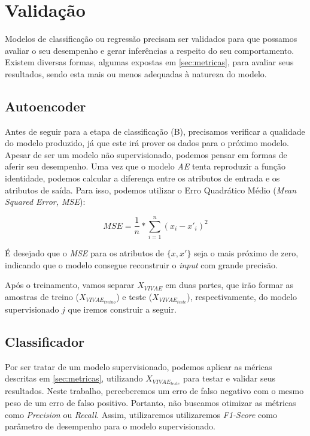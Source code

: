 \section{Validação}\label{sec:bravo_aval}

Modelos de classificação ou regressão precisam ser validados para que possamos avaliar o seu desempenho e gerar inferências a respeito do seu comportamento. Existem diversas formas, algumas expostas em \ref{sec:metricas}, para avaliar seus resultados, sendo esta mais ou menos adequadas à natureza do modelo.

\subsection{Autoencoder}

Antes de seguir para a etapa de classificação (B), precisamos verificar a qualidade do modelo produzido, já que este irá prover os dados para o próximo modelo. Apesar de ser um modelo não supervisionado, podemos pensar em formas de aferir seu desempenho. Uma vez que o modelo \textit{AE} tenta reproduzir a função identidade, podemos calcular a diferença entre os atributos de entrada e os atributos de saída. Para isso, podemos utilizar o Erro Quadrático Médio (\textit{Mean Squared Error, MSE}):

\begin{equation}
    MSE = \frac{1}{n} * \sum^n_{i=1} (x_i - x'_i)^2
\end{equation}

É desejado que o \textit{MSE} para os atributos de $\{x, x'\}$ seja o mais próximo de zero, indicando que o modelo consegue reconstruir o \textit{input} com grande precisão.

Após o treinamento, vamos separar $X_{VIVAE}$ em duas partes, que irão formar as amostras de treino ($X_{VIVAE_{treino}}$) e teste ($X_{VIVAE_{teste}}$), respectivamente, do modelo supervisionado $j$ que iremos construir a seguir.

\subsection{Classificador}

Por ser tratar de um modelo supervisionado, podemos aplicar as méricas descritas em \ref{sec:metricas}, utilizando $X_{VIVAE_{teste}}$ para testar e validar seus resultados. Neste trabalho, perceberemos um erro de  falso negativo com o mesmo peso de um erro de falso positivo. Portanto, não buscamos otimizar as métricas como \textit{Precision} ou \textit{Recall}. Assim, utilizaremos utilizaremos \textit{F1-Score} como parâmetro de desempenho para o modelo supervisionado.

